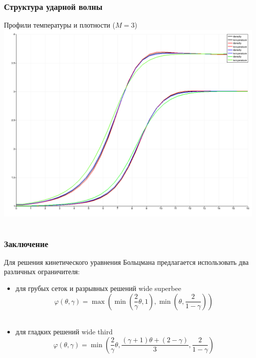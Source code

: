 \documentclass[ucs]{beamer}
\begin{document}
\begin{frame}
	\frametitle{Структура ударной волны}
	\centering
	 \begin{center}
	    Профили температуры и плотности (\(M=3\)) \\
	    \includegraphics[width=.8\textwidth]{shock}
	 \end{center}
 
\end{frame}

\section*{}
\begin{frame}
	\frametitle{Заключение}
	Для решения кинетического уравнения Больцмана предлагается использовать два различных ограничителя:
	\begin{itemize}
		\item для \alert{грубых} сеток и \alert{разрывных} решений \alert{wide superbee}
			\[ \varphi(\theta,\gamma) = \max\left(\min\left(\dfrac2{\gamma}\theta,1\right),\min\left(\theta,\dfrac2{1-\gamma}\right)\right) \] \\
		\item для \alert{гладких} решений \alert{wide third} 
			\[ \varphi(\theta,\gamma) = \min\left(\dfrac2{\gamma}\theta,\dfrac{(\gamma+1)\theta+(2-\gamma)}{3},\dfrac2{1-\gamma}\right) \] \\
	\end{itemize}

\end{frame}
\end{document}

